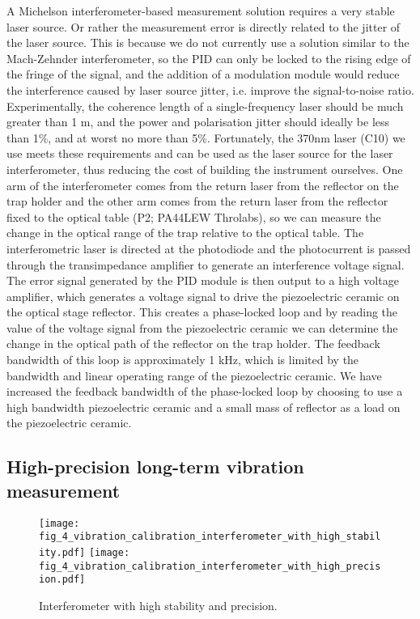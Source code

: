 A Michelson interferometer-based measurement solution requires a very stable laser source. Or rather the measurement error is directly related to the jitter of the laser source. This is because we do not currently use a solution similar to the Mach-Zehnder interferometer, so the PID can only be locked to the rising edge of the fringe of the signal, and the addition of a modulation module would reduce the interference caused by laser source jitter, i.e. improve the signal-to-noise ratio. Experimentally, the coherence length of a single-frequency laser should be much greater than 1 m, and the power and polarisation jitter should ideally be less than 1\%, and at worst no more than 5\%. Fortunately, the 370nm laser (C10) we use meets these requirements and can be used as the laser source for the laser interferometer, thus reducing the cost of building the instrument ourselves. One arm of the interferometer comes from the return laser from the reflector on the trap holder and the other arm comes from the return laser from the reflector fixed to the optical table (P2; PA44LEW Throlabs), so we can measure the change in the optical range of the trap relative to the optical table. The interferometric laser is directed at the photodiode and the photocurrent is passed through the transimpedance amplifier to generate an interference voltage signal. The error signal generated by the PID module is then output to a high voltage amplifier, which generates a voltage signal to drive the piezoelectric ceramic on the optical stage reflector. This creates a phase-locked loop and by reading the value of the voltage signal from the piezoelectric ceramic we can determine the change in the optical path of the reflector on the trap holder. The feedback bandwidth of this loop is approximately 1 kHz, which is limited by the bandwidth and linear operating range of the piezoelectric ceramic. We have increased the feedback bandwidth of the phase-locked loop by choosing to use a high bandwidth piezoelectric ceramic and a small mass of reflector as a load on the piezoelectric ceramic.

\subsection{High-precision long-term vibration measurement}

\begin{figure}
    \centering
    {\texttt{[image: fig\_4\_vibration\_calibration\_interferometer\_with\_high\_stability.pdf]}}
    {\texttt{[image: fig\_4\_vibration\_calibration\_interferometer\_with\_high\_precision.pdf]}}
    \caption{Interferometer with high stability and precision.}
    \label{fig:fig_4_vibration_calibration_interferometer}
\end{figure}

